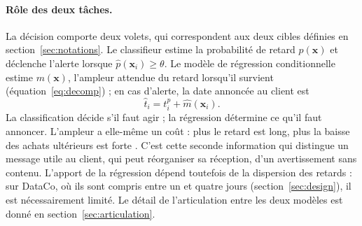 \documentclass[11pt,a4paper]{article}
\theoremstyle{definition}
\begin{document}
\paragraph{Rôle des deux tâches.} La décision comporte deux volets, qui correspondent aux deux cibles définies en section~\ref{sec:notations}. Le classifieur estime la probabilité de retard $p(\mathbf{x})$ et déclenche l'alerte lorsque $\hat{p}(\mathbf{x}_i) \ge \theta$. Le modèle de régression conditionnelle estime $m(\mathbf{x})$, l'ampleur attendue du retard lorsqu'il survient (équation~\eqref{eq:decomp}) ; en cas d'alerte, la date annoncée au client est
\begin{equation}
  \hat{t}_i = t_i^{p} + \hat{m}(\mathbf{x}_i).
  \label{eq:date-annoncee}
\end{equation}
La classification décide s'il faut agir ; la régression détermine ce qu'il faut annoncer. L'ampleur a elle-même un coût : plus le retard est long, plus la baisse des achats ultérieurs est forte \cite{rao2011failure}. C'est cette seconde information qui distingue un message utile au client, qui peut réorganiser sa réception, d'un avertissement sans contenu. L'apport de la régression dépend toutefois de la dispersion des retards : sur DataCo, où ils sont compris entre un et quatre jours (section~\ref{sec:design}), il est nécessairement limité. Le détail de l'articulation entre les deux modèles est donné en section~\ref{sec:articulation}.
\end{document}
